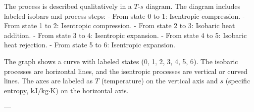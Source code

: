 The process is described qualitatively in a \( T \)-\( s \) diagram. The diagram includes labeled isobars and process steps:  
- From state 0 to 1: Isentropic compression.  
- From state 1 to 2: Isentropic compression.  
- From state 2 to 3: Isobaric heat addition.  
- From state 3 to 4: Isentropic expansion.  
- From state 4 to 5: Isobaric heat rejection.  
- From state 5 to 6: Isentropic expansion.  

The graph shows a curve with labeled states (0, 1, 2, 3, 4, 5, 6). The isobaric processes are horizontal lines, and the isentropic processes are vertical or curved lines. The axes are labeled as \( T \) (temperature) on the vertical axis and \( s \) (specific entropy, \( \text{kJ/kg·K} \)) on the horizontal axis.

---
